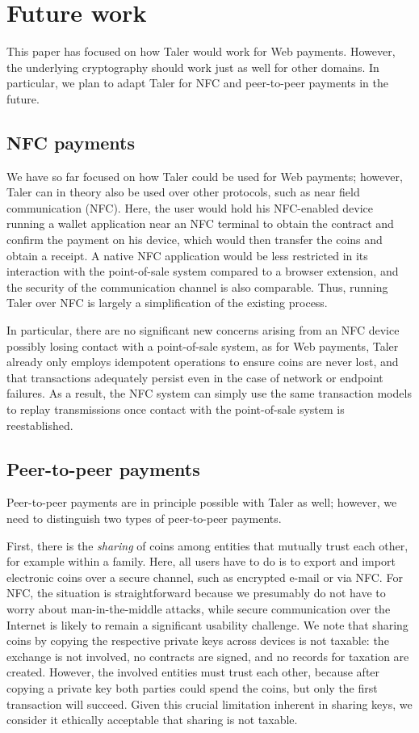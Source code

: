 \documentclass{llncs}
\begin{document}
\section{Future work}

This paper has focused on how Taler would work for Web payments.
However, the underlying cryptography should work just as well for
other domains.  In particular, we plan to adapt Taler for NFC and
peer-to-peer payments in the future.

\subsection{NFC payments}

We have so far focused on how Taler could be used for Web payments;
however, Taler can in theory also be used over other protocols, such
as near field communication (NFC).  Here, the user would hold his
NFC-enabled device running a wallet application near an NFC terminal
to obtain the contract and confirm the payment on his device, which
would then transfer the coins and obtain a receipt.  A native NFC
application would be less restricted in its interaction with the
point-of-sale system compared to a browser extension, and the security
of the communication channel is also comparable. Thus, running
Taler over NFC is largely a simplification of the existing process.

In particular, there are no significant new concerns arising from an
NFC device possibly losing contact with a point-of-sale system, as for
Web payments, Taler already only employs idempotent operations to
ensure coins are never lost, and that transactions adequately persist
even in the case of network or endpoint failures.  As a result, the
NFC system can simply use the same transaction models to replay
transmissions once contact with the point-of-sale system is
reestablished.


\subsection{Peer-to-peer payments}

Peer-to-peer payments are in principle possible with Taler as well;
however, we need to distinguish two types of peer-to-peer payments.

First, there is the {\em sharing} of coins among entities that
mutually trust each other, for example within a family.  Here, all
users have to do is to export and import electronic coins over a
secure channel, such as encrypted e-mail or via NFC.  For NFC, the
situation is straightforward because we presumably do not have to worry
about man-in-the-middle attacks, while secure communication over the
Internet is likely to remain a significant usability challenge.  We
note that sharing coins by copying the respective private keys across
devices is not taxable: the exchange is not involved, no contracts are
signed, and no records for taxation are created.  However, the
involved entities must trust each other, because after copying a private
key both parties could spend the coins, but only the first transaction
will succeed.  Given this crucial limitation
inherent in sharing keys, we consider it ethically acceptable that
sharing is not taxable.
\end{document}
